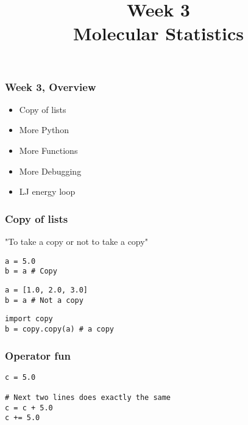 

\usepackage{soul}

\title[]{Week 3\\Molecular Statistics}








{
\usebackgroundtemplate{}
\begin{frame}[plain]
    \titlepage
    \addtocounter{framenumber}{-1}
\end{frame}
}

\begin{frame}[fragile]

    \frametitle{Week 3, Overview}

    \begin{itemize}
        \item Copy of lists
        \item More Python
        \item More Functions
        \item More Debugging
        \item LJ energy loop
    \end{itemize}

\end{frame}


\begin{frame}[fragile]

    \frametitle{Copy of lists}

    "To take a copy or not to take a copy"

    \bigskip

\begin{lstlisting}
a = 5.0
b = a # Copy
\end{lstlisting}

\begin{lstlisting}
a = [1.0, 2.0, 3.0]
b = a # Not a copy
\end{lstlisting}

\begin{lstlisting}
import copy
b = copy.copy(a) # a copy
\end{lstlisting}

\end{frame}


\begin{frame}[fragile]

    \frametitle{Operator fun}

\begin{lstlisting}
c = 5.0

# Next two lines does exactly the same
c = c + 5.0
c += 5.0
\end{lstlisting}

\end{frame}


